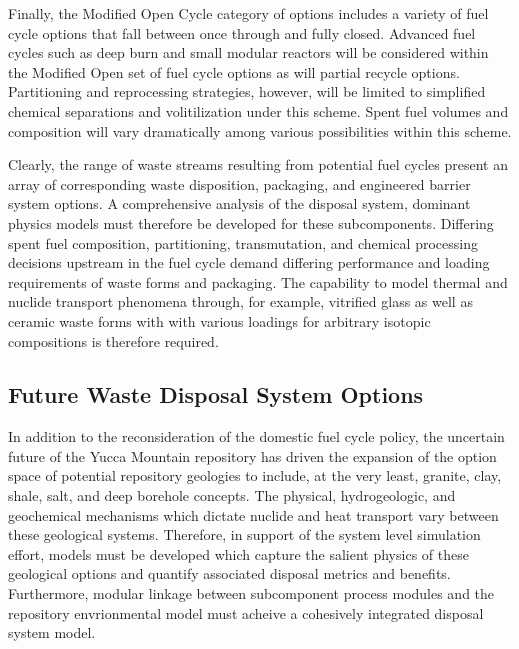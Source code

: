 Finally, the Modified Open Cycle category of options includes a 
variety of fuel cycle options that fall between once through and fully 
closed. Advanced fuel cycles such as deep burn and small modular 
reactors will be considered within the Modified Open set of fuel cycle 
options as will partial recycle options. Partitioning and reprocessing 
strategies, however, will be limited to simplified chemical 
separations and volitilization under this scheme. Spent fuel volumes 
and composition will vary dramatically among various possibilities 
within this scheme.  
\cite{department_of_energy_-_nuclear_energy_nuclear_2010} 

Clearly, the range of waste streams resulting from potential fuel 
cycles present an array of corresponding waste disposition, packaging, 
and engineered barrier system options. A comprehensive analysis of the 
disposal system, dominant physics models must therefore be developed 
for these subcomponents.  Differing spent fuel composition, 
partitioning, transmutation, and chemical processing decisions 
upstream in the fuel cycle demand differing performance and loading 
requirements of waste forms and packaging. The capability to model 
thermal and nuclide transport phenomena through, for example, 
vitrified glass as well as ceramic waste forms with with various 
loadings for arbitrary isotopic compositions is therefore required.  

\subsection{Future Waste Disposal System Options}

In addition to the reconsideration of the domestic fuel cycle policy, 
the uncertain future of the Yucca Mountain repository has driven the 
expansion of the option space of potential repository geologies to 
include, at the very least, granite, clay, shale, salt, and deep 
borehole concepts. The physical, hydrogeologic, and geochemical 
mechanisms which dictate nuclide and heat transport vary between these 
geological systems.  Therefore, in support of the system level 
simulation effort, models must be developed which capture the salient 
physics of these geological options and quantify associated disposal 
metrics and benefits.  Furthermore, modular linkage between 
subcomponent process modules and the repository envrionmental model 
must acheive a cohesively integrated disposal system model. 


